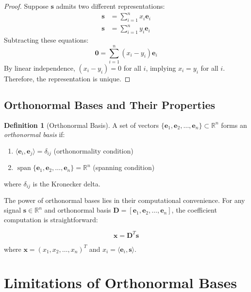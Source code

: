 \documentclass[12pt]{article}
\renewcommand{\vec}[1]{\mathbf{#1}}
\DeclareMathOperator{\spn}{span}
\newcommand{\R}{\mathbb{R}}
\theoremstyle{definition}
\newtheorem{definition}[theorem]{Definition}
\begin{document}
\begin{proof}
    Suppose $\vec{s}$ admits two different representations:
    \begin{align}
        \vec{s} & = \sum_{i=1}^{n} x_i \vec{e}_i \\
        \vec{s} & = \sum_{i=1}^{n} y_i \vec{e}_i
    \end{align}
    Subtracting these equations:
    \begin{equation}
        \vec{0} = \sum_{i=1}^{n} (x_i - y_i) \vec{e}_i
    \end{equation}
    By linear independence, $(x_i - y_i) = 0$ for all $i$, implying $x_i = y_i$ for all $i$. Therefore, the representation is unique.
\end{proof}

\subsection{Orthonormal Bases and Their Properties}

\begin{definition}[Orthonormal Basis]
    A set of vectors $\{\vec{e}_1, \vec{e}_2, \ldots, \vec{e}_n\} \subset \R^n$ forms an \textit{orthonormal basis} if:
    \begin{enumerate}
        \item $\langle \vec{e}_i, \vec{e}_j \rangle = \delta_{ij}$ (orthonormality condition)
        \item $\spn\{\vec{e}_1, \vec{e}_2, \ldots, \vec{e}_n\} = \R^n$ (spanning condition)
    \end{enumerate}
    where $\delta_{ij}$ is the Kronecker delta.
\end{definition}

The power of orthonormal bases lies in their computational convenience. For any signal $\vec{s} \in \R^n$ and orthonormal basis $\mathbf{D} = [\vec{e}_1, \vec{e}_2, \ldots, \vec{e}_n]$, the coefficient computation is straightforward:

\begin{equation}
    \vec{x} = \mathbf{D}^T \vec{s}
\end{equation}

where $\vec{x} = (x_1, x_2, \ldots, x_n)^T$ and $x_i = \langle \vec{e}_i, \vec{s} \rangle$.

\newpage

\section{Limitations of Orthonormal Bases}
\end{document}
